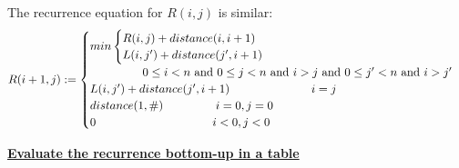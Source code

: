 \documentclass[11pt]{article}
\begin{document}
\begin{enumerate}
  The recurrence equation for $R(i,j)$ is similar:
  \begin{equation}
    R(i+1,j) := \begin{cases}
      min\begin{cases}
      R(i,j) + distance(i,i+1)\\
      L(i,j') + distance(j',i+1)\\
      \end{cases}\\
      \-\hspace{4.5em} 0 \leq i < n \text{ and } 0 \leq j < n
      \text{ and } i > j \text{ and } 0 \leq j' < n \text{ and } i >
      j'\\ 
      L(i,j') + distance(j',i+1) \-\hspace{7em} i = j\\
      distance(1, \#) \-\hspace{4.5em} i = 0, j = 0\\
      0 \-\hspace{10em} i < 0, j < 0
    \end{cases}
  \end{equation}


  \underline{\textbf{Evaluate the recurrence bottom-up in a table}}
 
  

\end{enumerate}
\end{document}

